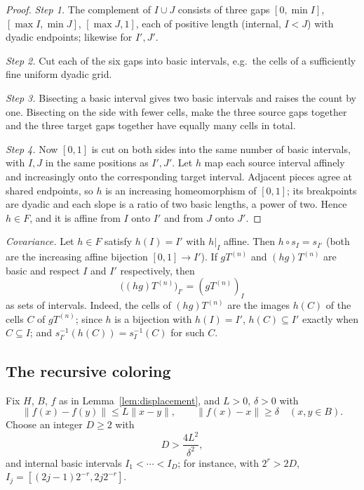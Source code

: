 \documentclass[11pt]{article}
\newcommand{\norm}[1]{\lVert #1\rVert}
\theoremstyle{definition}
\numberwithin{equation}{section}
\begin{document}
\begin{proof}
\emph{Step 1.} The complement of $I\cup J$ consists of three gaps
$[0,\min I]$, $[\max I,\min J]$, $[\max J,1]$, each of positive length
(internal, $I<J$) with dyadic endpoints; likewise for $I',J'$.

\emph{Step 2.} Cut each of the six gaps into basic intervals, e.g.\ the
cells of a sufficiently fine uniform dyadic grid.

\emph{Step 3.} Bisecting a basic interval gives two basic intervals and
raises the count by one. Bisecting on the side with fewer cells, make
the three source gaps together and the three target gaps together have
equally many cells in total.

\emph{Step 4.} Now $[0,1]$ is cut on both sides into the same number of
basic intervals, with $I,J$ in the same positions as $I',J'$. Let $h$
map each source interval affinely and increasingly onto the
corresponding target interval. Adjacent pieces agree at shared
endpoints, so $h$ is an increasing homeomorphism of $[0,1]$; its
breakpoints are dyadic and each slope is a ratio of two basic lengths,
a power of two. Hence $h\in F$, and it is affine from $I$ onto $I'$ and
from $J$ onto $J'$.
\end{proof}

\emph{Covariance.} Let $h\in F$ satisfy $h(I)=I'$ with $h|_I$ affine.
Then $h\circ s_I=s_{I'}$ (both are the increasing affine bijection
$[0,1]\to I'$). If $gT^{(n)}$ and $(hg)T^{(n)}$ are basic and respect
$I$ and $I'$ respectively, then
\begin{equation}\label{dyad:covariance}
  \bigl((hg)T^{(n)}\bigr)_{I'}=(gT^{(n)})_I
\end{equation}
as sets of intervals. Indeed, the cells of $(hg)T^{(n)}$ are the images
$h(C)$ of the cells $C$ of $gT^{(n)}$; since $h$ is a bijection with
$h(I)=I'$, $h(C)\subseteq I'$ exactly when $C\subseteq I$; and
$s_{I'}^{-1}(h(C))=s_I^{-1}(C)$ for such $C$.

\subsection{The recursive coloring}\label{sec:coloring}

Fix $H$, $B$, $f$ as in Lemma~\ref{lem:displacement}, and $L>0$,
$\delta>0$ with
\begin{equation}\label{color:map}
  \norm{f(x)-f(y)}\leq L\norm{x-y},\qquad
  \norm{f(x)-x}\geq\delta\quad(x,y\in B).
\end{equation}
Choose an integer $D\ge2$ with
\begin{equation}\label{color:parameters}
  D>\frac{4L^2}{\delta^2},
\end{equation}
and internal basic intervals $I_1<\cdots<I_D$; for instance, with
$2^r>2D$, $I_j=[(2j-1)2^{-r},2j2^{-r}]$.
\end{document}
